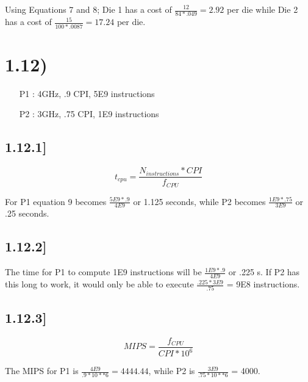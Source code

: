 \documentclass[a4paper,11pt]{article}
\begin{document}
Using Equations 7 and 8; Die 1 has a cost of $\frac{12}{84 * .049} = 2.92$ per die while Die 2 has a cost of $\frac{15}{100 * .0087} = 17.24$ per die.


\section*{1.12)}

\begin{enumerate}
  \item [P1]: 4GHz, .9 CPI, 5E9 instructions
  \item [P2]: 3GHz, .75 CPI, 1E9 instructions
\end{enumerate}

\subsection*{1.12.1]}

\begin{equation}
t_{cpu} = \frac{N_{instructions} * CPI}{f_{CPU}}
\end{equation}

For P1 equation 9 becomes $\frac{5E9 * .9}{4E9}$ or  1.125 seconds, while P2 becomes $\frac{1E9 * .75}{3E9}$ or .25 seconds.

\subsection*{1.12.2]}

The time for P1 to compute 1E9 instructions will be $\frac{1E9 * .9}{4E9}$ or .225 s.  If P2 has this long to work, it would only be able to execute $\frac{.225 * 3E9}{.75}$ = 9E8 instructions.  


\subsection*{1.12.3]}
\begin{equation}
MIPS = \frac{f_{CPU}}{CPI * 10^{6}}
\end{equation}

The MIPS for P1 is $\frac{4E9}{.9 * 10**{6}} = 4444.44$, while P2 is $\frac{3E9}{.75*10**6}$ = 4000.
\end{document}

